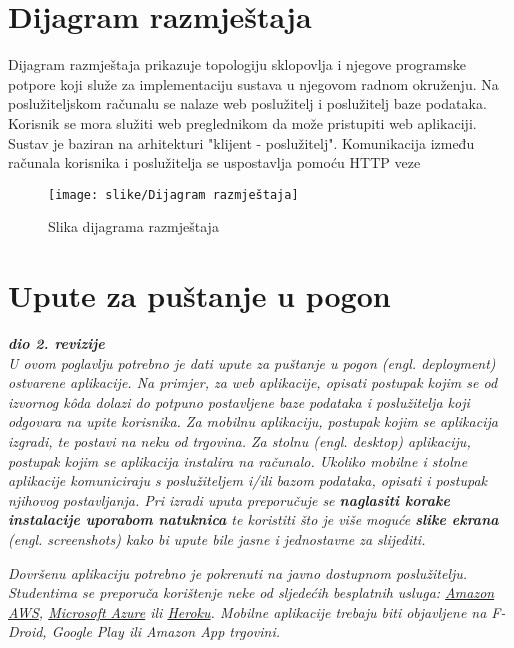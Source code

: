 			\eject 
		
		
		\section{Dijagram razmještaja}
			
			Dijagram razmještaja prikazuje topologiju sklopovlja i njegove programske potpore koji služe za implementaciju sustava u njegovom radnom okruženju. Na poslužiteljskom računalu se nalaze web poslužitelj i poslužitelj baze podataka. Korisnik se mora služiti web preglednikom da može pristupiti web aplikaciji. Sustav je baziran na arhitekturi "klijent - poslužitelj". Komunikacija između računala korisnika i poslužitelja se uspostavlja pomoću HTTP veze
			 \begin{figure}[hbt!]
			 	\centering
			 	\texttt{[image: slike/Dijagram razmještaja]}
			 	\caption{Slika dijagrama razmještaja}
			 	\label{fig:enter-label}
			 \end{figure}
			
			\eject 
		
		\section{Upute za puštanje u pogon}
		
			\textbf{\textit{dio 2. revizije}}\\
		
			 \textit{U ovom poglavlju potrebno je dati upute za puštanje u pogon (engl. deployment) ostvarene aplikacije. Na primjer, za web aplikacije, opisati postupak kojim se od izvornog kôda dolazi do potpuno postavljene baze podataka i poslužitelja koji odgovara na upite korisnika. Za mobilnu aplikaciju, postupak kojim se aplikacija izgradi, te postavi na neku od trgovina. Za stolnu (engl. desktop) aplikaciju, postupak kojim se aplikacija instalira na računalo. Ukoliko mobilne i stolne aplikacije komuniciraju s poslužiteljem i/ili bazom podataka, opisati i postupak njihovog postavljanja. Pri izradi uputa preporučuje se \textbf{naglasiti korake instalacije uporabom natuknica} te koristiti što je više moguće \textbf{slike ekrana} (engl. screenshots) kako bi upute bile jasne i jednostavne za slijediti.}
			
			
			 \textit{Dovršenu aplikaciju potrebno je pokrenuti na javno dostupnom poslužitelju. Studentima se preporuča korištenje neke od sljedećih besplatnih usluga: \href{https://aws.amazon.com/}{Amazon AWS}, \href{https://azure.microsoft.com/en-us/}{Microsoft Azure} ili \href{https://www.heroku.com/}{Heroku}. Mobilne aplikacije trebaju biti objavljene na F-Droid, Google Play ili Amazon App trgovini.}
			
			
			\eject 